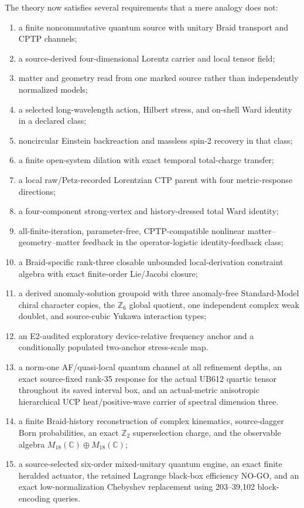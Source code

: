 \documentclass[11pt]{article}
\theoremstyle{definition}
\theoremstyle{remark}
\begin{document}
The theory now satisfies several requirements that a mere analogy does not:
\begin{enumerate}
\item a finite noncommutative quantum source with unitary Braid transport and CPTP channels;
\item a source-derived four-dimensional Lorentz carrier and local tensor field;
\item matter and geometry read from one marked source rather than independently normalized models;
\item a selected long-wavelength action, Hilbert stress, and on-shell Ward identity in a declared class;
\item noncircular Einstein backreaction and massless spin-2 recovery in that class;
\item a finite open-system dilation with exact temporal total-charge transfer;
\item a local raw/Petz-recorded Lorentzian CTP parent with four metric-response directions;
\item a four-component strong-vertex and history-dressed total Ward identity;
\item all-finite-iteration, parameter-free, CPTP-compatible nonlinear matter--geometry--matter feedback in the operator-logistic identity-feedback class;
\item a Braid-specific rank-three closable unbounded local-derivation constraint algebra with exact finite-order Lie/Jacobi closure;
\item a derived anomaly-solution groupoid with three anomaly-free Standard-Model chiral character copies, the $\mathbb Z_6$ global quotient, one independent complex weak doublet, and source-cubic Yukawa interaction types;
\item an E2-audited exploratory device-relative frequency anchor and a conditionally populated two-anchor stress-scale map.
\item a norm-one AF/quasi-local quantum channel at all refinement depths, an exact source-fixed rank-35 response for the actual UB612 quartic tensor throughout its saved interval box, and an actual-metric anisotropic hierarchical UCP heat/positive-wave carrier of spectral dimension three.
\item a finite Braid-history reconstruction of complex kinematics, source-dagger Born probabilities, an exact $\mathbb Z_2$ superselection charge, and the observable algebra $M_{18}(\mathbb C)\oplus M_{18}(\mathbb C)$;
\item a source-selected six-order mixed-unitary quantum engine, an exact finite heralded actuator, the retained Lagrange black-box efficiency NO-GO, and an exact low-normalization Chebyshev replacement using 203--39,102 block-encoding queries.

\end{enumerate}
\end{document}
